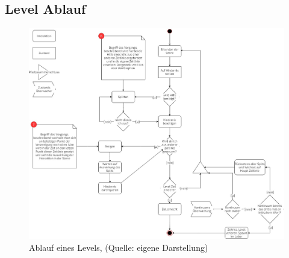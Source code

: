 \subsection{Level Ablauf}

\begin{figure}[ht]
\centering
\includegraphics[width=1\linewidth]{content/pictures/level_loop.jpg}
\caption{Ablauf eines Levels, (Quelle: eigene Darstellung)}
\label{fig:level_loop}
\end{figure}

